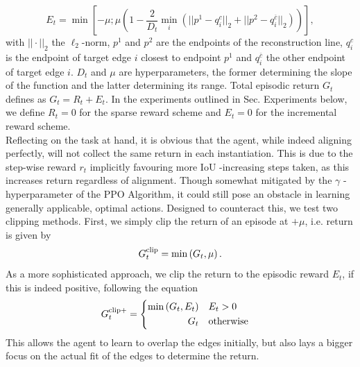 \documentclass[11pt]{article} %
\begin{document}
\begin{equation}
    E_t = \min \left[-\mu; \mu \left(1 - \frac{2}{D_t} \min_i \left(||p^1  - q_{i}^c||_2 + ||p^2 - q_i^{\overline{c}}||_2 \right)\right)\right] ,
    \label{eq: methods-env-rew-distancetrigger}
\end{equation}
with $||\cdot||_2$ the $\ell_2$-norm, $p^1$ and $p^2$ are the endpoints of the reconstruction line, $q_i^c$ is the endpoint of target edge $i$ closest to endpoint $p^1$ and $q_i^{\overline{c}}$ the other endpoint of target edge $i$.  $D_t$ and $\mu$ are hyperparameters, the former determining the slope of the function and the latter determining its range. Total episodic return $G_t$ defines as $G_t = R_t + E_t$. In the experiments outlined in Sec. Experiments below, we define $R_t=0$ for the sparse reward scheme and $E_t=0$ for the incremental reward scheme.\\
Reflecting on the task at hand, it is obvious that the agent, while indeed aligning perfectly, will not collect the same return in each instantiation.
This is due to the step-wise reward $r_t$ implicitly favouring more IoU -increasing steps taken, as this increases return regardless of alignment.
Though somewhat mitigated by the $\gamma$ -hyperparameter of the PPO Algorithm, it could still pose an obstacle in learning generally applicable, optimal actions.
Designed to counteract this, we test two clipping methods. 
First, we simply clip the return of an episode at $+ \mu$, i.e. return is given by \begin{equation}G_t^{\textnormal{clip}} = \min\left(G_t, \mu\right).\end{equation} As a more sophisticated approach, we clip the return to the episodic reward $E_t$, if this is indeed positive, following the equation
\begin{equation}
    G_t^\textnormal{clip+} =\begin{cases}
    \begin{aligned}
     \min\left(G_t, E_t\right) & \quad E_t > 0 \\
    G_t & \quad \textnormal{otherwise} \\
    \end{aligned}
    \end{cases}
\end{equation}
This allows the agent to learn to overlap the edges initially, but also lays a bigger focus on the actual fit of the edges to determine the return.
\end{document}
